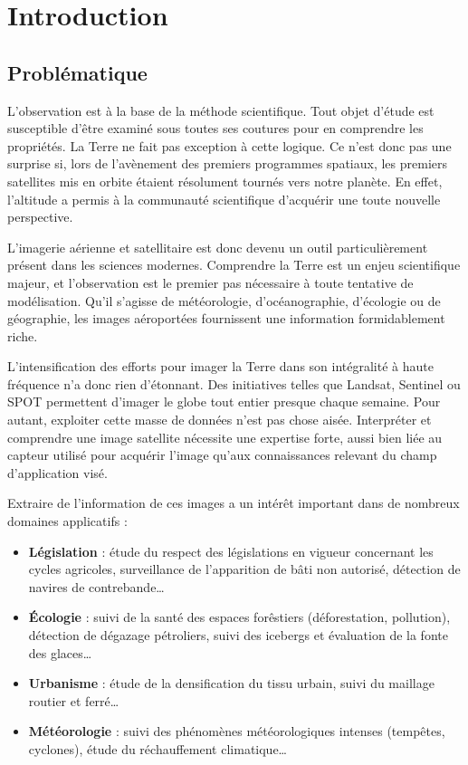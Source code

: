 \chapter{Introduction}
	\citationChap{}{}
	\minitoc
	\newpage


\section{Problématique}
L'observation est à la base de la méthode scientifique. Tout objet d'étude est susceptible d'être examiné sous toutes ses coutures pour en comprendre les propriétés. La Terre ne fait pas exception à cette logique. Ce n'est donc pas une surprise si, lors de l'avènement des premiers programmes spatiaux, les premiers satellites mis en orbite étaient résolument tournés vers notre planète. En effet, l'altitude a permis à la communauté scientifique d'acquérir une toute nouvelle perspective.

L'imagerie aérienne et satellitaire est donc devenu un outil particulièrement présent dans les sciences modernes. Comprendre la Terre est un enjeu scientifique majeur, et l'observation est le premier pas nécessaire à toute tentative de modélisation. Qu'il s'agisse de météorologie, d'océanographie, d'écologie ou de géographie, les images aéroportées fournissent une information formidablement riche.

L'intensification des efforts pour imager la Terre dans son intégralité à haute fréquence n'a donc rien d'étonnant. Des initiatives telles que Landsat, Sentinel ou SPOT permettent d'imager le globe tout entier presque chaque semaine. Pour autant, exploiter cette masse de données n'est pas chose aisée. Interpréter et comprendre une image satellite nécessite une expertise forte, aussi bien liée au capteur utilisé pour acquérir l'image qu'aux connaissances relevant du champ d'application visé.

Extraire de l'information de ces images a un intérêt important dans de nombreux domaines applicatifs :
\begin{itemize}
	\item \textbf{Législation} : étude du respect des législations en vigueur concernant les cycles agricoles, surveillance de l'apparition de bâti non autorisé, détection de navires de contrebande\dots
	\item \textbf{Écologie} : suivi de la santé des espaces forêstiers (déforestation, pollution), détection de dégazage pétroliers, suivi des icebergs et évaluation de la fonte des glaces\dots
	\item \textbf{Urbanisme} : étude de la densification du tissu urbain, suivi du maillage routier et ferré\dots
	\item \textbf{Météorologie} : suivi des phénomènes météorologiques intenses (tempêtes, cyclones), étude du réchauffement climatique\dots
\end{itemize}

